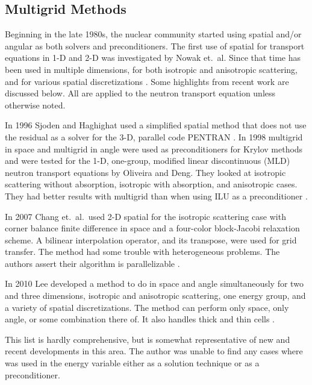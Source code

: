 \subsection{Multigrid Methods}
Beginning in the late 1980s, the nuclear community started using spatial \mg and/or angular \mg as both solvers and preconditioners. The first use of spatial \mg for transport equations in 1-D and 2-D was investigated by Nowak et.\ al. Since that time \mg has been used in multiple dimensions, for both isotropic and anisotropic scattering, and for various spatial discretizations \cite{Adams2002}. Some highlights from recent work are discussed below. All are applied to the \Sn neutron transport equation unless otherwise noted. 

In 1996 Sjoden and Haghighat used a simplified spatial \mg method that does not use the residual as a solver for the 3-D, parallel code PENTRAN \cite{Sjoden1996}. In 1998 multigrid in space and multigrid in angle were used as preconditioners for Krylov methods and were tested for the 1-D, one-group, modified linear discontinuous (MLD) neutron transport equations by Oliveira and Deng. They looked at isotropic scattering without absorption, isotropic with absorption, and anisotropic cases. They had better results with multigrid than when using ILU as a preconditioner \cite{Oliveira1998}.

In 2007 Chang et.\ al.\ used 2-D spatial \mg for the isotropic scattering case with corner balance finite difference in space and a four-color block-Jacobi relaxation scheme. A bilinear interpolation operator, and its transpose, were used for grid transfer. The method had some trouble with heterogeneous problems. The authors assert their algorithm is parallelizable \cite{Chang2007}.

In 2010 Lee developed a method to do \mg in space and angle simultaneously for two and three dimensions, isotropic and anisotropic scattering, one energy group, and a variety of spatial discretizations. The method can perform \mg only space, only angle, or some combination there of. It also handles thick and thin cells \cite{Lee2010}.

This list is hardly comprehensive, but is somewhat representative of new and recent developments in this area. The author was unable to find any cases where \mg was used in the energy variable either as a solution technique or as a preconditioner. 

